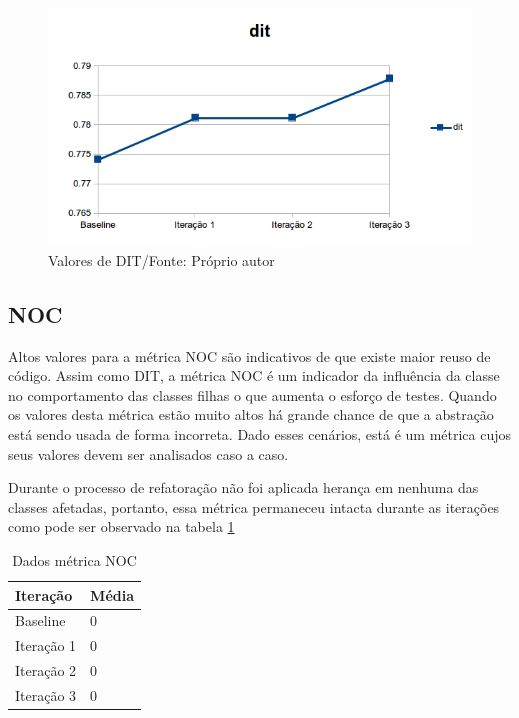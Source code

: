 \begin{figure}[h]
	\centering
	\includegraphics{img/dit.png}
	\caption{Valores de DIT/Fonte: Próprio autor}
	\label{fig:dit}
\end{figure}


\subsection{NOC}

Altos valores para a métrica NOC são indicativos de que existe maior reuso de
código. Assim como DIT, a métrica NOC é um indicador da influência da classe
no comportamento das classes filhas o que aumenta o esforço de testes. Quando os
valores desta métrica estão muito altos há grande chance de que a abstração está
sendo usada de forma incorreta. Dado esses cenários, está é um métrica cujos
seus valores devem ser analisados caso a caso.

Durante o processo de refatoração não foi aplicada herança em nenhuma das
classes afetadas, portanto, essa métrica permaneceu intacta durante as iterações
como pode ser observado na tabela \ref{tab:noc} %

\begin{table}[h]
	\centering
	    \caption{Dados métrica NOC}
    \begin{tabular}{ | l | l | }
    \hline
    Iteração & Média 			\\ \hline
    Baseline & 0  	\\ \hline
    Iteração 1 & 0			\\ \hline
	Iteração 2 & 0				\\ \hline
	Iteração 3 & 0	\\ \hline
    \end{tabular}
    \label{tab:noc}
\end{table}

